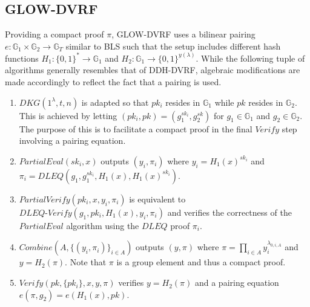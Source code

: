 \documentclass[letterpaper,twocolumn,10pt]{article}
\theoremstyle{definition}
\theoremstyle{remark}
\begin{document}
\subsection{GLOW-DVRF}
\label{appendix:glow-dvrf}
Providing a compact proof $\pi$, GLOW-DVRF uses a bilinear pairing $e: \mathbb{G}_1 \times \mathbb{G}_2 \rightarrow \mathbb{G}_T$ similar to BLS such that the setup includes different hash functions $H_1: \{0, 1\}^* \rightarrow \mathbb{G}_1$ and $H_2: \mathbb{G}_1 \rightarrow \{0, 1\}^{y(\lambda)}$. While the following tuple of algorithms generally resembles that of DDH-DVRF, algebraic modifications are made accordingly to reflect the fact that a pairing is used.
\begin{enumerate}
\item $DKG(1^\lambda, t, n)$ is adapted so that $pk_i$ resides in $\mathbb{G}_1$ while $pk$ resides in $\mathbb{G}_2$. This is achieved by letting $(pk_i, pk) = (g_1^{sk_i}, g_2^{sk})$ for $g_1 \in \mathbb{G}_1$ and $g_2 \in \mathbb{G}_2$. The purpose of this is to facilitate a compact proof in the final $Verify$ step involving a pairing equation.
\item $PartialEval(sk_i, x)$ outputs $(y_i, \pi_i)$ where $y_i = H_1(x)^{sk_i}$ and $\pi_i = DLEQ(g_1, g_1^{sk_i}, H_1(x), H_1(x)^{sk_i})$.
\item $PartialVerify(pk_i, x, y_i, \pi_i)$ is equivalent to $DLEQ\text{-}Verify(g_1, pk_i, H_1(x), y_i, \pi_i)$ and verifies the correctness of the $PartialEval$ algorithm using the $DLEQ$ proof $\pi_i$.
\item $Combine(A, \{(y_i, \pi_i)\}_{i \in A})$ outputs $(y, \pi)$ where $\pi = \prod_{i \in A} y_i^{\lambda_{0, i, A}}$ and $y = H_2(\pi)$. Note that $\pi$ is a group element and thus a compact proof.
\item $Verify(pk, \{pk_i\}, x, y, \pi)$ verifies $y = H_2(\pi)$ and a pairing equation $e(\pi, g_2) = e(H_1(x), pk)$.
\end{enumerate}
\end{document}
